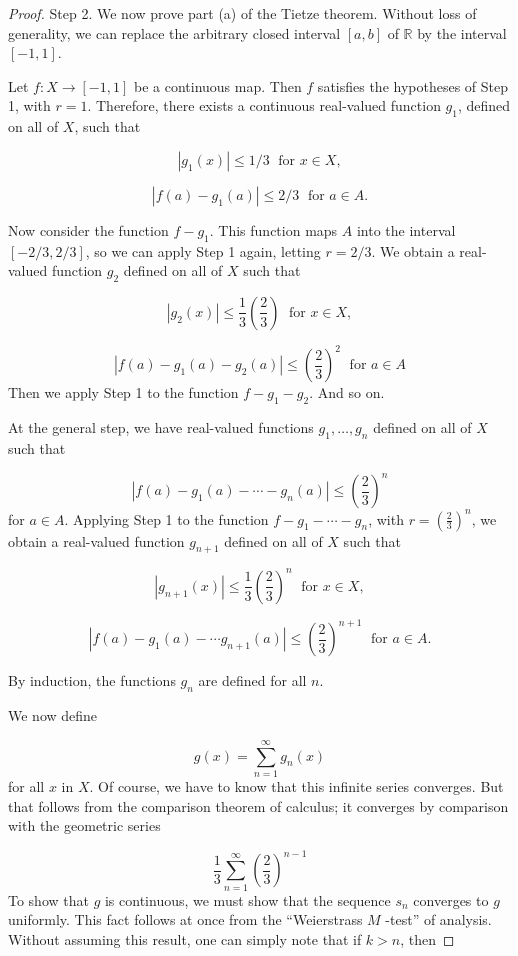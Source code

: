 \begin{proof}
Step 2. We now prove part (a) of the Tietze theorem. Without loss of generality, we can replace the arbitrary closed interval \([ {a,b}]\) of \(\mathbb{R}\) by the interval \([ {-1,1}]\).

Let \(f : X \rightarrow [ {-1,1}]\) be a continuous map. Then \(f\) satisfies the hypotheses of Step 1, with \(r = 1\). Therefore, there exists a continuous real-valued function \(g_{1}\), defined on all of \(X\), such that

\[
| {g_{1}(x) }| \leq 1/3\;\text{ for }x \in X,
\]

\[
| {f( a) - g_{1}( a) }| \leq 2/3\;\text{ for }a \in A.
\]

Now consider the function \(f - g_{1}\). This function maps \(A\) into the interval \([ {-2/3,2/3}]\), so we can apply Step 1 again, letting \(r = 2/3\). We obtain a real-valued function \(g_{2}\) defined on all of \(X\) such that

\[
| {g_{2}(x) }| \leq \frac{1}{3}( \frac{2}{3}) \;\text{ for }x \in X,
\]

\[
| {f( a) - g_{1}( a) - g_{2}( a) }| \leq {( \frac{2}{3}) }^{2}\;\text{ for }a \in A
\]
Then we apply Step 1 to the function \(f - g_{1} - g_{2}\). And so on.

At the general step, we have real-valued functions \(g_{1},\ldots ,g_{n}\) defined on all of \(X\) such that

\[
| {f( a) - g_{1}( a) - \cdots - g_{n}( a) }| \leq {( \frac{2}{3}) }^{n}
\]
for \(a \in A\). Applying Step 1 to the function \(f - g_{1} - \cdots - g_{n}\), with \(r = {( \frac{2}{3}) }^{n}\), we obtain a real-valued function \(g_{n + 1}\) defined on all of \(X\) such that

\[
| {g_{n + 1}(x) }| \leq \frac{1}{3}{( \frac{2}{3}) }^{n}\;\text{ for }x \in X,
\]

\[
| {f( a) - g_{1}( a) - \cdots {g}_{n + 1}( a) }| \leq {( \frac{2}{3}) }^{n + 1}\;\text{ for }a \in A.
\]

By induction, the functions \(g_{n}\) are defined for all \(n\).

We now define

\[
g(x) = \mathop{\sum }\limits_{{n = 1}}^{\infty }g_{n}(x)
\]
for all \(x\) in \(X\). Of course, we have to know that this infinite series converges. But that follows from the comparison theorem of calculus; it converges by comparison with the geometric series

\[
\frac{1}{3}\mathop{\sum }\limits_{{n = 1}}^{\infty }{( \frac{2}{3}) }^{n - 1}
\]
To show that \(g\) is continuous, we must show that the sequence \(s_{n}\) converges to \(g\) uniformly. This fact follows at once from the ``Weierstrass \(M\) -test'' of analysis. Without assuming this result, one can simply note that if \(k > n\), then


\end{proof}
